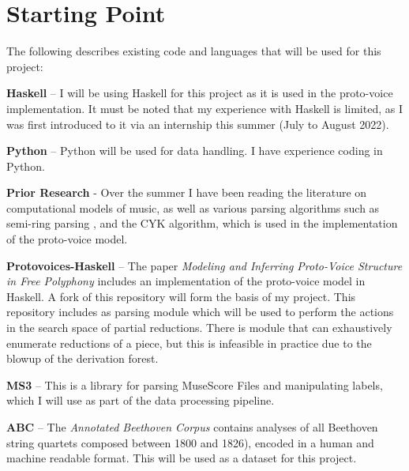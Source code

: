 \documentclass{article}
\newcommand{\keyword}[1]{\textbf{#1}}
\begin{document}
\section{Starting Point}
The following describes existing code and languages that will be used for this project:
\par
\bigskip
\keyword{Haskell} -- I will be using Haskell for this project as it is used in the proto-voice implementation. It must be noted that my experience with Haskell is limited, as I was first introduced to it via an internship this summer (July to August 2022).
\par
\bigskip
\keyword{Python} -- Python will be used for data handling. I have experience coding in Python.
\par
\bigskip
\keyword{Prior Research} - Over the summer I have been reading the literature on computational models of music, as well as various parsing algorithms such as semi-ring parsing \cite{goodman_semiring_1999}, and the CYK algorithm, which is used in the implementation of the proto-voice model.
\par
\bigskip
\keyword{Protovoices-Haskell} -- The paper \textit{Modeling and Inferring Proto-Voice Structure in Free Polyphony}\cite{finkensiep_modeling_2021} includes an implementation of the proto-voice model in Haskell. A fork of this repository will form the basis of my project.
This repository includes as parsing module which will be used to perform the actions in the search space of partial reductions. There is module that can exhaustively enumerate reductions of a piece, but this is infeasible in practice due to the blowup of the derivation forest.
\par
\bigskip
\keyword{MS3} -- This is a library for parsing MuseScore Files and manipulating labels\cite{johannes_ms3_2021}, which I will use as part of the data processing pipeline.
\par
\bigskip
\keyword{ABC} -- The \textit{Annotated Beethoven Corpus}\cite{neuwirth_annotated_2018} contains analyses of all Beethoven string quartets composed between 1800 and 1826), encoded in a human and machine readable format. This will be used as a dataset for this project. 
\par
%
\end{document}
